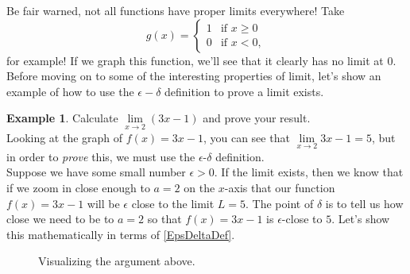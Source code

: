 \documentclass[12pt]{article}
\theoremstyle{definition}
\newtheorem{exmp}[thm]{Example}
\theoremstyle{plain}
\numberwithin{equation}{section}
\begin{document}
Be fair warned, not all functions have proper limits everywhere! Take
\[
g(x)=\begin{cases}
  1 & \text{if } x\geq 0\\
  0 & \text{if }  x<0,
\end{cases} %
\]for example! If we graph this function, we'll see that it clearly has no limit at 0. Before moving on to some of the interesting properties of limit, let's show an example of how to use the $\epsilon-\delta$ definition to prove a limit exists.
\begin{exmp}
  Calculate $\lim\limits_{x\to 2} (3x-1)$ and prove your result. \\

Looking at the graph of $f(x)=3x-1$, you can see that $\lim\limits_{x\to 2} 3x-1=5$, but in order to \emph{prove} this, we must use the $\epsilon$-$\delta$ definition.\\

Suppose we have some small number $\epsilon>0$. If the limit exists, then we know that if we zoom in close enough to $a=2$ on the $x$-axis that our function $f(x)=3x-1$ will be $\epsilon$ close to the limit $L=5$. The point of $\delta$ is to tell us how close we need to be to $a=2$ so that $f(x)=3x-1$ is $\epsilon$-close to $5$. Let's show this mathematically in terms of \cref{EpsDeltaDef}.\\

\begin{figure}
  \centering
{}
\caption{Visualizing the argument above.}
\end{figure}


\end{exmp}
\end{document}
